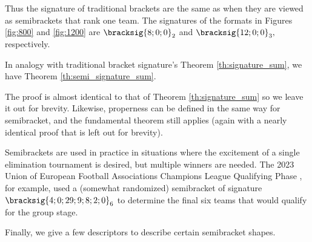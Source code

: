 {    

    Thus the signature of traditional brackets are the same as when they are viewed as semibrackets that rank one team. The signatures of the formats in Figures \ref{fig:800} and \ref{fig:1200} are $\bracksig{8;0;0}_2$ and $\bracksig{12;0;0}_3,$ respectively.

    In analogy with traditional bracket signature's Theorem \ref{th:signature_sum}, we have Theorem \ref{th:semi_signature_sum}.


    The proof is almost identical to that of Theorem \ref{th:signature_sum} so we leave it out for brevity. Likewise, properness can be defined in the same way for semibracket, and the fundamental theorem still applies (again with a nearly identical proof that is left out for brevity).


    Semibrackets are used in practice in situations where the excitement of a single elimination tournament is desired, but multiple winners are needed. The 2023 Union of European Football Associations Champions League Qualifying Phase \cite{wiki_uefa}, for example, used a (somewhat randomized) semibracket of signature $\bracksig{4;0;29;9;8;2;0}_6$ to determine the final six teams that would qualify for the group stage.


    Finally, we give a few descriptors to describe certain semibracket shapes.



}
